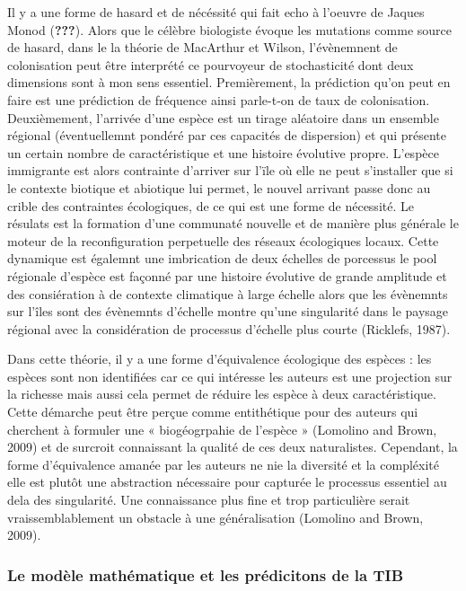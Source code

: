 Il y a une forme de hasard et de nécéssité qui fait echo à l'oeuvre de
Jaques Monod ({\textbf{???}}). Alors que le célèbre biologiste évoque
les mutations comme source de hasard, dans le la théorie de MacArthur et
Wilson, l'évènemnent de colonisation peut être interprété ce pourvoyeur
de stochasticité dont deux dimensions sont à mon sens essentiel.
Premièrement, la prédiction qu'on peut en faire est une prédiction de
fréquence ainsi parle-t-on de taux de colonisation. Deuxièmement,
l'arrivée d'une espèce est un tirage aléatoire dans un ensemble régional
(éventuellemnt pondéré par ces capacités de dispersion) et qui présente
un certain nombre de caractéristique et une histoire évolutive propre.
L'espèce immigrante est alors contrainte d'arriver sur l'ïle où elle ne
peut s'installer que si le contexte biotique et abiotique lui permet, le
nouvel arrivant passe donc au crible des contraintes écologiques, de ce
qui est une forme de nécessité. Le résulats est la formation d'une
communaté nouvelle et de manière plus générale le moteur de la
reconfiguration perpetuelle des réseaux écologiques locaux. Cette
dynamique est égalemnt une imbrication de deux échelles de porcessus le
pool régionale d'espèce est façonné par une histoire évolutive de grande
amplitude et des consiération à de contexte climatique à large échelle
alors que les évènemnts sur l'îles sont des évènemnts d'échelle montre
qu'une singularité dans le paysage régional avec la considération de
processus d'échelle plus courte (Ricklefs, 1987).

Dans cette théorie, il y a une forme d'équivalence écologique des
espèces : les espèces sont non identifiées car ce qui intéresse les
auteurs est une projection sur la richesse mais aussi cela permet de
réduire les espèce à deux caractéristique. Cette démarche peut être
perçue comme entithétique pour des auteurs qui cherchent à formuler une
« biogéogrpahie de l'espèce » (Lomolino and Brown, 2009) et de surcroit
connaissant la qualité de ces deux naturalistes. Cependant, la forme
d'équivalence amanée par les auteurs ne nie la diversité et la
compléxité elle est plutôt une abstraction nécessaire pour capturée le
processus essentiel au dela des singularité. Une connaissance plus fine
et trop particulière serait vraissemblablement un obstacle à une
généralisation (Lomolino and Brown, 2009).

\subsubsection{Le modèle mathématique et les prédicitons de la
TIB}\label{le-moduxe8le-mathuxe9matique-et-les-pruxe9dicitons-de-la-tib}

